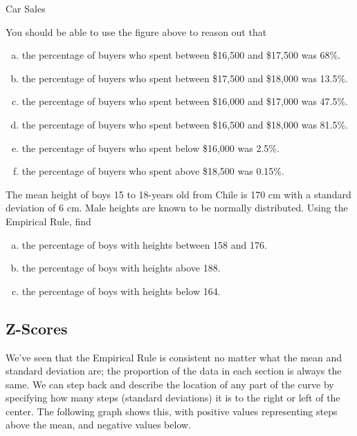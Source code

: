 \begin{example}[https://www.youtube.com/watch?v=E8rczzYhOL4]{Car Sales}
\begin{center}
\begin{tikzpicture}
\end{tikzpicture}
\end{center}

You should be able to use the figure above to reason out that
\begin{enumerate}[(a)]
\item the percentage of buyers who spent between \$16,500 and \$17,500 was 68\%.
\item the percentage of buyers who spent between \$17,500 and \$18,000 was 13.5\%.
\item the percentage of buyers who spent between \$16,000 and \$17,000 was 47.5\%.
\item the percentage of buyers who spent between \$16,500 and \$18,000 was 81.5\%.
\item the percentage of buyers who spent below \$16,000 was 2.5\%.
\item the percentage of buyers who spent above \$18,500 was 0.15\%.
\end{enumerate}
\end{example}

\begin{try}
The mean height of boys 15 to 18-years old from Chile is 170 cm with a standard deviation of 6 cm. Male heights are known to be normally distributed. Using the Empirical Rule, find
\begin{enumerate}[(a)]
\item the percentage of boys with heights between 158 and 176. 
\item the percentage of boys with heights above 188.
\item the percentage of boys with heights below 164.
\end{enumerate}
\end{try}
\vfill
\pagebreak

\subsection{Z-Scores}
We've seen that the Empirical Rule is consistent no matter what the mean and standard deviation are; the proportion of the data in each section is always the same.  We can step back and describe the location of any part of the curve by specifying how many steps (standard deviations) it is to the right or left of the center.  The following graph shows this, with positive values representing steps above the mean, and negative values below.

